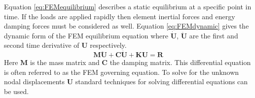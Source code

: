 \documentclass[11pt,a4paper]{report}
\begin{document}
Equation \ref{eq:FEMequilibrium} describes a static equilibrium at a specific
point in time. If the loads are applied rapidly then element inertial forces and
energy damping forces must be considered as well. Equation \ref{eq:FEMdynamic} gives
the dynamic form of the FEM equilibrium equation where $\dot{\mathbf{U}}$, $\ddot{\mathbf{U}}$ are the
first and second time derivative of $\mathbf{U}$ respectively.
\begin{equation}\label{eq:FEMdynamic}
\mathbf{M}\ddot{\mathbf{U}} + \mathbf{C}\dot{\mathbf{U}} + \mathbf{K}\mathbf{U}
= \mathbf{R}
\end{equation}
Here $\mathbf{M}$ is the mass matrix and $\mathbf{C}$ the damping matrix. This differential
equation is often referred to as the FEM governing equation. To solve for the
unknown nodal displacements $\mathbf{U}$ standard techniques for solving
differential equations can be used.
\end{document}
